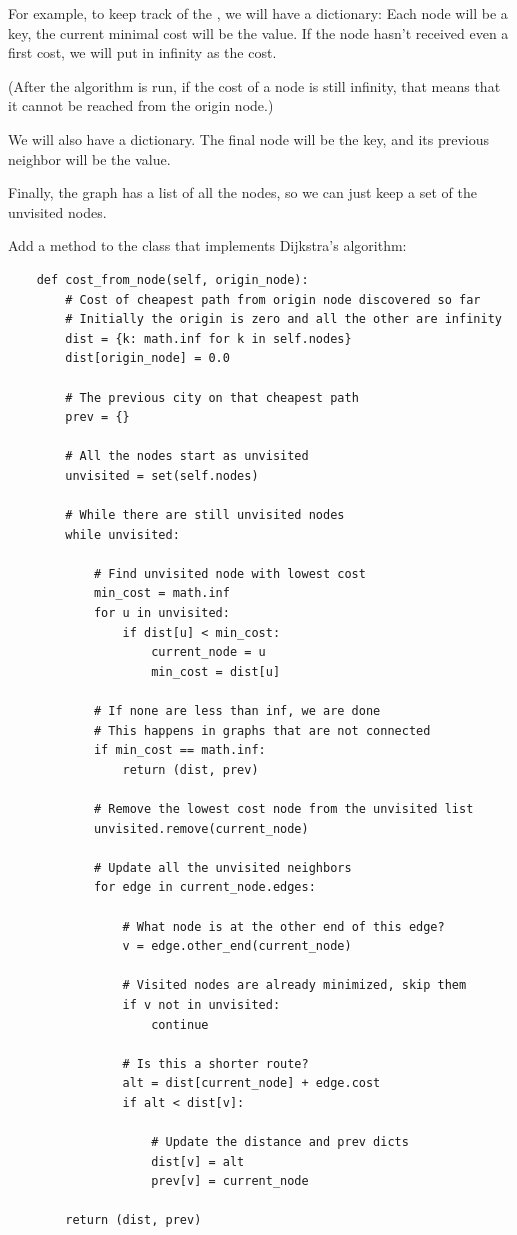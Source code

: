 For example, to keep track of the , we will have a
 dictionary: Each node will be a key, the current minimal
cost will be the value.  If the node hasn't received even a first
cost, we will put in infinity as the cost.

(After the algorithm is run, if the cost of a node is still infinity,
that means that it cannot be reached from the origin node.)

We will also have a  dictionary. The final node will be
the key, and its previous neighbor will be the value.

Finally, the graph has a list of all the nodes, so we can just keep a
set of the unvisited nodes.

Add a method to the  class that implements Dijkstra's algorithm:
\begin{verbatim}
    def cost_from_node(self, origin_node):
        # Cost of cheapest path from origin node discovered so far
        # Initially the origin is zero and all the other are infinity
        dist = {k: math.inf for k in self.nodes}
        dist[origin_node] = 0.0

        # The previous city on that cheapest path
        prev = {}

        # All the nodes start as unvisited
        unvisited = set(self.nodes)
    
        # While there are still unvisited nodes
        while unvisited:

            # Find unvisited node with lowest cost
            min_cost = math.inf
            for u in unvisited:
                if dist[u] < min_cost:
                    current_node = u
                    min_cost = dist[u]

            # If none are less than inf, we are done
            # This happens in graphs that are not connected
            if min_cost == math.inf:
                return (dist, prev)
            
            # Remove the lowest cost node from the unvisited list
            unvisited.remove(current_node)

            # Update all the unvisited neighbors
            for edge in current_node.edges:

                # What node is at the other end of this edge?
                v = edge.other_end(current_node)

                # Visited nodes are already minimized, skip them
                if v not in unvisited:
                    continue

                # Is this a shorter route?
                alt = dist[current_node] + edge.cost
                if alt < dist[v]:

                    # Update the distance and prev dicts
                    dist[v] = alt
                    prev[v] = current_node

        return (dist, prev)
\end{verbatim}

